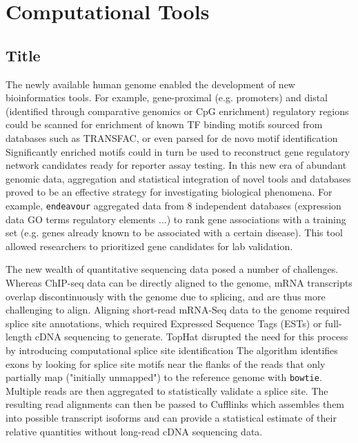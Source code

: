 \chapter{Computational Tools}
\section{Title}
The newly available human genome enabled the development of new bioinformatics tools. For example, gene-proximal (e.g. promoters) and distal (identified through comparative genomics or CpG enrichment) regulatory regions could be scanned for enrichment of known TF binding motifs sourced from databases such as TRANSFAC, or even parsed for de novo motif identification Significantly enriched motifs could in turn be used to reconstruct gene regulatory network candidates ready for reporter assay testing. In this new era of abundant genomic data, aggregation and statistical integration of novel tools and databases proved to be an effective strategy for investigating biological phenomena. For example, \verb|endeavour| aggregated data from 8 independent databases (expression data GO terms regulatory elements ...) to rank gene associations with a training set (e.g. genes already known to be associated with a certain disease). This tool allowed researchers to prioritized gene candidates for lab validation.

The new wealth of quantitative sequencing data posed a number of challenges. Whereas ChIP-seq data can be directly aligned to the genome, mRNA transcripts overlap discontinuously with the genome due to splicing, and are thus more challenging to align. Aligning short-read mRNA-Seq data to the genome required splice site annotations, which required Expressed Sequence Tags (ESTs) or full-length cDNA sequencing to generate. TopHat disrupted the need for this process by introducing computational splice site identification The algorithm identifies exons by looking for splice site motifs near the flanks of the reads that only partially map ("initially unmapped") to the reference genome with \verb|bowtie|. Multiple reads are then aggregated to statistically validate a splice site. The resulting read alignments can then be passed to Cufflinks which assembles them into possible transcript isoforms and can provide a statistical estimate of their relative quantities without long-read cDNA sequencing data.

